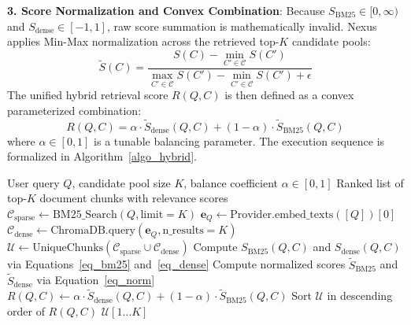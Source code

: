 \documentclass[pdflatex,sn-mathphys-num]{sn-jnl}%
\theoremstyle{thmstyleone}%
\theoremstyle{thmstyletwo}%
\theoremstyle{thmstylethree}%
\begin{document}
\noindent\textbf{3. Score Normalization and Convex Combination}:
Because $S_{\text{BM25}} \in [0, \infty)$ and $S_{\text{dense}} \in [-1, 1]$, raw score summation is mathematically invalid. Nexus applies Min-Max normalization across the retrieved top-$K$ candidate pools:
\begin{equation}
\tilde{S}(C) = \frac{S(C) - \min_{C' \in \mathcal{C}} S(C')}{\max_{C' \in \mathcal{C}} S(C') - \min_{C' \in \mathcal{C}} S(C') + \epsilon}\label{eq_norm}
\end{equation}
The unified hybrid retrieval score $R(Q, C)$ is then defined as a convex parameterized combination:
\begin{equation}
R(Q, C) = \alpha \cdot \tilde{S}_{\text{dense}}(Q, C) + (1 - \alpha) \cdot \tilde{S}_{\text{BM25}}(Q, C)\label{eq_hybrid}
\end{equation}
where $\alpha \in [0, 1]$ is a tunable balancing parameter. The execution sequence is formalized in Algorithm~\ref{algo_hybrid}.

\begin{algorithm}
\caption{Hybrid Dense-Sparse Retrieval Procedure}\label{algo_hybrid}
\begin{algorithmic}[1]
\Require User query $Q$, candidate pool size $K$, balance coefficient $\alpha \in [0, 1]$
\Ensure Ranked list of top-$K$ document chunks with relevance scores
\State $\mathcal{C}_{\text{sparse}} \leftarrow \text{BM25\_Search}(Q, \text{limit}=K)$
\State $\mathbf{e}_Q \leftarrow \text{Provider}.\text{embed\_texts}([Q])[0]$
\State $\mathcal{C}_{\text{dense}} \leftarrow \text{ChromaDB}.\text{query}(\mathbf{e}_Q, \text{n\_results}=K)$
\State $\mathcal{U} \leftarrow \text{UniqueChunks}(\mathcal{C}_{\text{sparse}} \cup \mathcal{C}_{\text{dense}})$
    \State Compute $S_{\text{BM25}}(Q, C)$ and $S_{\text{dense}}(Q, C)$ via Equations~\ref{eq_bm25} and~\ref{eq_dense}
\EndFor
\State Compute normalized scores $\tilde{S}_{\text{BM25}}$ and $\tilde{S}_{\text{dense}}$ via Equation~\ref{eq_norm}
    \State $R(Q, C) \leftarrow \alpha \cdot \tilde{S}_{\text{dense}}(Q, C) + (1 - \alpha) \cdot \tilde{S}_{\text{BM25}}(Q, C)$
\EndFor
\State Sort $\mathcal{U}$ in descending order of $R(Q, C)$
\State \Return $\mathcal{U}[1 \dots K]$
\end{algorithmic}
\end{algorithm}

\end{document}

